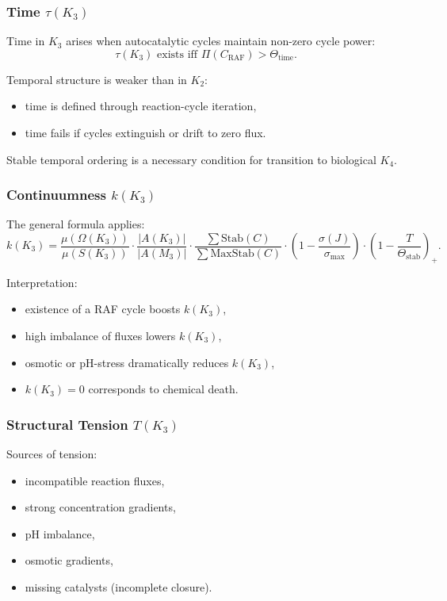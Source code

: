 \subsubsection{Time \texorpdfstring{$\tau(K_3)$}{\tau(K_3)}}

Time in $K_3$ arises when autocatalytic cycles maintain non-zero cycle
power:
\[
\tau(K_3) \text{ exists iff } \Pi(C_{\mathrm{RAF}}) >
\Theta_{\mathrm{time}}.
\]

Temporal structure is weaker than in $K_2$:
\begin{itemize}
    \item time is defined through reaction-cycle iteration,
    \item time fails if cycles extinguish or drift to zero flux.
\end{itemize}

Stable temporal ordering is a necessary condition for transition to
biological $K_4$.

\subsubsection{Continuumness \texorpdfstring{$k(K_3)$}{k(K_3)}}

The general formula applies:
\[
k(K_3) =
\frac{\mu(\Omega(K_3))}{\mu(S(K_3))}
\cdot
\frac{|A(K_3)|}{|A(M_3)|}
\cdot
\frac{\sum \mathrm{Stab}(C)}{\sum \mathrm{MaxStab}(C)}
\cdot
(1 - \frac{\sigma(J)}{\sigma_{\max}})
\cdot
(1 - \frac{T}{\Theta_{\mathrm{stab}}})_+.
\]

Interpretation:
\begin{itemize}
    \item existence of a RAF cycle boosts $k(K_3)$,
    \item high imbalance of fluxes lowers $k(K_3)$,
    \item osmotic or pH-stress dramatically reduces $k(K_3)$,
    \item $k(K_3)=0$ corresponds to chemical death.
\end{itemize}

\subsubsection{Structural Tension \texorpdfstring{$T(K_3)$}{T(K_3)}}

Sources of tension:
\begin{itemize}
    \item incompatible reaction fluxes,
    \item strong concentration gradients,
    \item pH imbalance,
    \item osmotic gradients,
    \item missing catalysts (incomplete closure).
\end{itemize}

